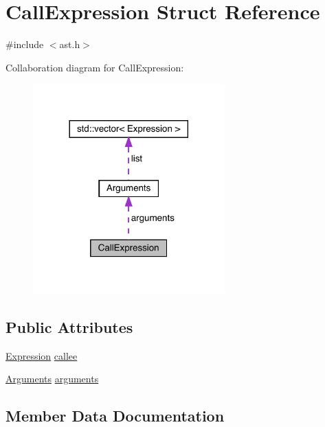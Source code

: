 \hypertarget{struct_call_expression}{}\section{Call\+Expression Struct Reference}
\label{struct_call_expression}


{\ttfamily \#include $<$ast.\+h$>$}



Collaboration diagram for Call\+Expression\+:\nopagebreak
\begin{figure}[H]
\begin{center}
\leavevmode
\includegraphics[width=209pt]{struct_call_expression__coll__graph}
\end{center}
\end{figure}
\subsection*{Public Attributes}
\begin{DoxyCompactItemize}
\item 
\hyperlink{ast_8h_a4cb273a4d960cd13ea17d08f254493e8}{Expression} \hyperlink{struct_call_expression_ae87e9c0eff85a02aaaf7281cb8782936}{callee}
\item 
\hyperlink{struct_arguments}{Arguments} \hyperlink{struct_call_expression_af0e464328e5af6ad84a5690f0d4fea4a}{arguments}
\end{DoxyCompactItemize}


\subsection{Member Data Documentation}
\mbox{\label{struct_call_expression_af0e464328e5af6ad84a5690f0d4fea4a}} 
